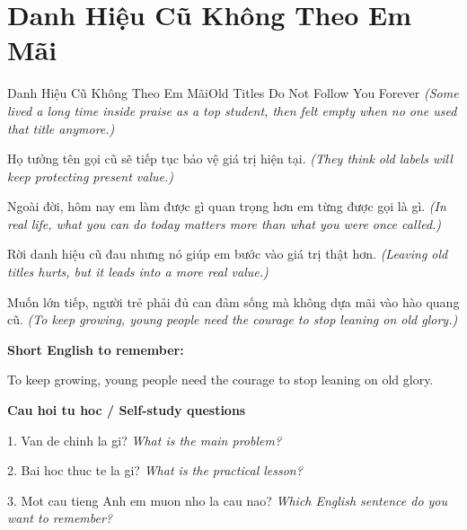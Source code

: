 \section{Danh Hiệu Cũ Không Theo Em Mãi}
\begin{truyen}{Danh Hiệu Cũ Không Theo Em Mãi}{Old Titles Do Not Follow You Forever}
\textit{(Some lived a long time inside praise as a top student, then felt empty when no one used that title anymore.)}

Họ tưởng tên gọi cũ sẽ tiếp tục bảo vệ giá trị hiện tại.
\textit{(They think old labels will keep protecting present value.)}

Ngoài đời, hôm nay em làm được gì quan trọng hơn em từng được gọi là gì.
\textit{(In real life, what you can do today matters more than what you were once called.)}

Rời danh hiệu cũ đau nhưng nó giúp em bước vào giá trị thật hơn.
\textit{(Leaving old titles hurts, but it leads into a more real value.)}

\end{truyen}

\begin{baihoc}
Muốn lớn tiếp, người trẻ phải đủ can đảm sống mà không dựa mãi vào hào quang cũ.
\textit{(To keep growing, young people need the courage to stop leaning on old glory.)}
\end{baihoc}

\begin{ghinhoanh}
\textbf{Short English to remember:}

To keep growing, young people need the courage to stop leaning on old glory.

\end{ghinhoanh}

\begin{tuhocnhanh}
\textbf{Cau hoi tu hoc / Self-study questions}

1. Van de chinh la gi? \textit{What is the main problem?}

2. Bai hoc thuc te la gi? \textit{What is the practical lesson?}

3. Mot cau tieng Anh em muon nho la cau nao? \textit{Which English sentence do you want to remember?}
\end{tuhocnhanh}
\ngancach

